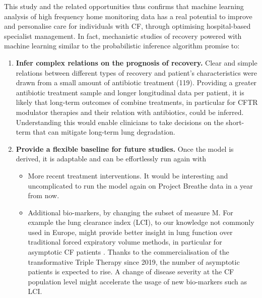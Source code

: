 This study and the related opportunities thus confirms that machine learning analysis of high frequency home monitoring data has a real potential to improve and personalise care for individuals with CF, through optimising hospital-based specialist management. In fact, mechanistic studies of recovery powered with machine learning similar to the probabilistic inference algorithm promise to:
\begin{enumerate}
    \item \textbf{Infer complex relations on the prognosis of recovery.} Clear and simple relations between different types of recovery and patient's characteristics were drawn from a small amount of antibiotic treatment (119). Providing a greater antibiotic treatment sample and longer longitudinal data per patient, it is likely that long-term outcomes of combine treatments, in particular for CFTR modulator therapies and their relation with antibiotics, could be inferred. Understanding this would enable clinicians to take decisions on the short-term that can mitigate long-term lung degradation. 
    \item \textbf{Provide a flexible baseline for future studies.} Once the model is derived, it is adaptable and can be effortlessly run again with 
    \begin{itemize}
        \item More recent treatment interventions. It would be interesting and uncomplicated to run the model again on Project Breathe data in a year from now.
        \item Additional bio-markers, by changing the subset of measure M. For example the lung clearance index (LCI), to our knowledge not commonly used in Europe, might provide better insight in lung function over traditional forced expiratory volume methods, in particular for asymptotic CF patients \cite{fuchs_2009}. Thanks to the commercialisation of the transformative Triple Therapy since 2019, the number of asymptotic patients is expected to rise. A change of disease severity at the CF population level might accelerate the usage of new bio-markers such as LCI.
    \end{itemize}
    
\end{enumerate}
\newpage